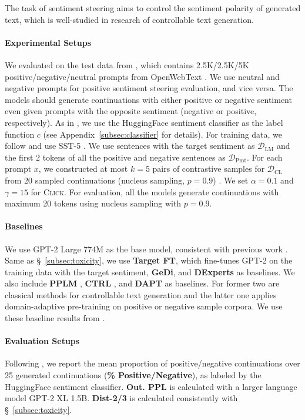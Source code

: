 The task of sentiment steering aims to control the sentiment polarity of generated text, which is well-studied in research of controllable text generation.

\paragraph{Experimental Setups} We evaluated on the test data from \cite{dexperts}, which contains 2.5K/2.5K/5K positive/negative/neutral prompts from OpenWebText \cite{openwebtext}. We use neutral and negative prompts for positive sentiment steering evaluation, and vice versa. The models should generate continuations with either positive or negative sentiment even given prompts with the opposite sentiment (negative or positive, respectively). As in \cite{dexperts}, we use the HuggingFace sentiment classifier as the label function $c$ (see Appendix~\ref{subsec:classifier} for details). For training data, we follow \cite{dexperts} and use SST-5 \cite{sst}. We use sentences with the target sentiment as $\mathcal{D}_\mathrm{LM}$ and the first 2 tokens of all the positive and negative sentences as $\mathcal{D}_\mathrm{Pmt}$.
For each prompt $x$, we constructed at most $k=5$ pairs of contrastive samples for $\mathcal{D}_\mathrm{CL}$ from 20 sampled continuations (nucleus sampling, $p=0.9$) . We set $\alpha=0.1$ and $\gamma=15$ for \textsc{Click}.
For evaluation, all the models generate continuations with maximum 20 tokens using nucleus sampling with $p=0.9$.

\paragraph{Baselines}
We use GPT-2 Large 774M as the base model, consistent with previous work \cite{dexperts}. Same as \S~\ref{subsec:toxicity}, we use \textbf{Target FT}, which fine-tunes GPT-2 on the training data with the target sentiment, \textbf{GeDi}, and \textbf{DExperts} as baselines. We also include \textbf{PPLM} \cite{pplm}, \textbf{CTRL} \cite{ctrl}, and \textbf{DAPT} \cite{dexperts} as baselines. For former two are classical methods for controllable text generation and the latter one applies domain-adaptive pre-training on positive or negative sample corpora. We use these baseline results from \cite{dexperts}.

\paragraph{Evaluation Setups} Following \cite{dexperts}, we report the mean proportion of positive/negative continuations over 25 generated continuations (\textbf{\% Positive/Negative}), as labeled by the HuggingFace sentiment classifier.
\textbf{Out. PPL} is calculated with a larger language model GPT-2 XL 1.5B.
\textbf{Dist-2/3} is calculated consistently with \S~\ref{subsec:toxicity}.

